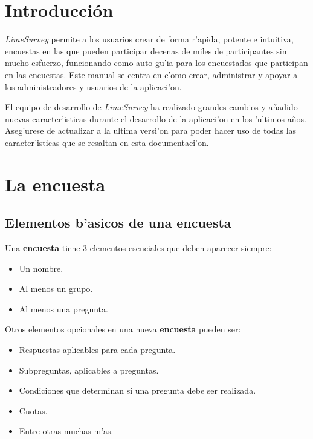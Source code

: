 \documentclass[12pt,spanish]{report}
\begin{document}
\doublespacing
{}
\tableofcontents
\newpage


\chapter{Introducci\'on}
\newpage

\emph{LimeSurvey} permite a los usuarios crear de forma r'apida, potente e intuitiva, encuestas en las que pueden participar decenas de miles de participantes sin mucho esfuerzo, funcionando como auto-gu'ia para los encuestados que participan en las encuestas. Este manual se centra en c'omo crear, administrar y apoyar a los administradores y usuarios de la aplicaci'on.

El equipo de desarrollo de \emph{LimeSurvey} ha realizado grandes cambios y añadido nuevas caracter'isticas durante el desarrollo de la aplicaci'on en los 'ultimos años. Aseg'urese de actualizar a la ultima versi'on para poder hacer uso de todas las caracter'isticas que se resaltan en esta documentaci'on.
\newpage

\chapter{La encuesta}
\newpage

\section{Elementos b'asicos de una encuesta}

Una {\bf encuesta} tiene 3 elementos esenciales que deben aparecer siempre:

\begin{itemize}
\item Un nombre.
\item Al menos un grupo.
\item Al menos una pregunta.
\end{itemize}

Otros elementos opcionales en una nueva {\bf encuesta}  pueden ser:
\begin{itemize}
\item Respuestas aplicables para cada pregunta.
\item Subpreguntas, aplicables a preguntas.
\item Condiciones que determinan si una pregunta debe ser realizada.
\item Cuotas.
\item Entre otras muchas m'as.
\end{itemize}
\end{document}
